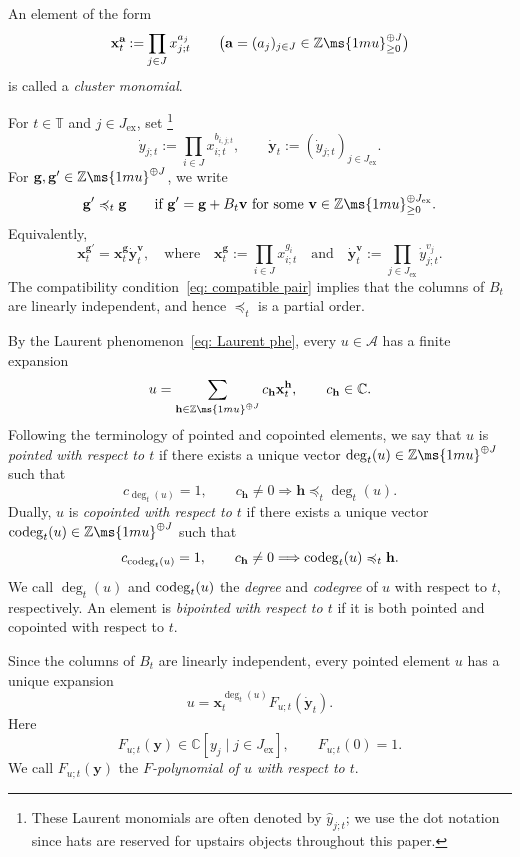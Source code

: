 \documentclass[12pt, leqno]{amsart}
\numberwithin{equation}{section}
\theoremstyle{plain}
\theoremstyle{definition}
\renewcommand{\preceq}{\preccurlyeq}
\newcommand{\seteq}{\mathbin{:=}}
\newcommand{\ex}{\mathrm{ex}}
\newcommand{\C}{\mathbb{C}}
\newcommand{\Z}{\mathbb{Z}\ms{1mu}}
\newcommand{\codeg}{{\rm codeg}}
\newcommand{\bbT}{\mathbb{T}}
\newcommand{\dbfy}{\dot{\bfy}}
\newcommand{\dy}{\dot{y}}
\newcommand{\bfa}{\mathbf{a}}
\newcommand{\bfg}{\mathbf{g}}
\newcommand{\bfh}{\mathbf{h}}
\newcommand{\bfv}{\mathbf{v}}
\newcommand{\bfx}{\mathbf{x}}
\newcommand{\bfy}{\mathbf{y}}
\newcommand{\calA}{\mathcal{A}}
\newcommand{\qtq}[1][{and}]{\quad\text{{#1}}\quad}
\begin{document}
An element of the form
\[
\bfx_t^{\bfa}\seteq\prod_{j\in J}x_{j;t}^{a_j}
\qquad
\bigl(\bfa=(a_j)_{j\in J}\in\Z_{\geq0}^{\oplus J}\bigr)
\]
is called a \emph{cluster monomial}.

For \(t\in\bbT\) and \(j\in J_{\ex}\), set \footnote{These Laurent monomials are often denoted by
\(\widehat y_{j;t}\); we use the dot notation since hats are reserved
for upstairs objects throughout this paper.}
\[
\dy_{j;t}\seteq\prod_{i\in J}x_{i;t}^{b_{i,j;t}},
\qquad
\dbfy_t\seteq(\dy_{j;t})_{j\in J_{\ex}}.
\]
For \(\bfg,\bfg'\in\Z^{\oplus J}\), we write
\[
\bfg'\preceq_t\bfg \qquad \text{if $\bfg'=\bfg+B_t\bfv$ for some $\bfv\in\Z_{\geq0}^{\oplus J_{\ex}}$.}
\]
Equivalently,
\[
\bfx_t^{\bfg'}=\bfx_t^{\bfg}\dbfy_t^{\bfv},
\quad \text{where} \quad
\bfx_t^{\bfg}\seteq\prod_{i\in J}x_{i;t}^{g_i}
\qtq 
\dbfy_t^{\bfv}\seteq\prod_{j\in J_{\ex}}\dy_{j;t}^{v_j}.
\]
The compatibility condition~\eqref{eq: compatible pair} implies that the columns of \(B_t\)
are linearly independent, and hence \(\preceq_t\) is a partial order.

By the Laurent phenomenon~\eqref{eq: Laurent phe}, every \(u\in\calA\) has a finite
expansion
\begin{align} \label{eq: u expression}
u=\sum_{\bfh\in\Z^{\oplus J}}c_{\bfh}\bfx_t^{\bfh}, \qquad c_{\bfh}\in\C.    
\end{align}
Following the terminology of pointed and copointed elements, we say
that \(u\) is \emph{pointed with respect to \(t\)} if there exists a
unique vector \(\deg_t(u)\in\Z^{\oplus J}\) such that
\[
c_{\deg_t(u)}=1, \qquad c_{\bfh}\ne0\Longrightarrow\bfh\preceq_t\deg_t(u).
\]
Dually, \(u\) is \emph{copointed with respect to \(t\)} if there
exists a unique vector \(\codeg_t(u)\in\Z^{\oplus J}\) such that
\[
c_{\codeg_t(u)}=1, \qquad c_{\bfh}\ne0\Longrightarrow\codeg_t(u)\preceq_t\bfh.
\]
We call \(\deg_t(u)\) and \(\codeg_t(u)\) the \emph{degree} and
\emph{codegree} of \(u\) with respect to \(t\), respectively.  An
element is \emph{bipointed with respect to \(t\)} if it is both
pointed and copointed with respect to \(t\).

Since the columns of \(B_t\) are linearly independent, every
pointed element \(u\) has a unique expansion
\begin{equation}\label{eq: pointed F expansion}
u=\bfx_t^{\deg_t(u)}F_{u;t}(\dbfy_t).
\end{equation}
 Here 
\[
F_{u;t}(\bfy)\in\C[y_j\mid j\in J_{\ex}], \qquad F_{u;t}(0)=1.
\]
We call \(F_{u;t}(\bfy)\) the \emph{\(F\)-polynomial of \(u\) with
respect to \(t\)}.
\end{document}
